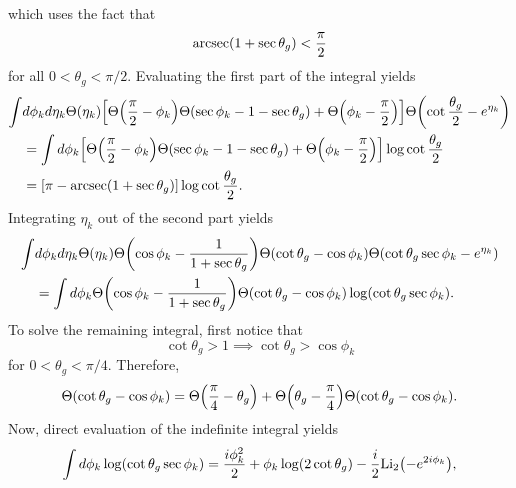 \documentclass[11pt,twoside,reqno]{amsart}
\theoremstyle{plain}
\theoremstyle{remark}
\theoremstyle{definition}
\theoremstyle{remark}
\theoremstyle{definition}
\theoremstyle{definition}
\newcommand{\Li}{\mathrm{Li}}
\begin{document}
	which uses the fact that
	\begin{equation}
		\arcsec(1 + \sec\theta_g) < \frac{\pi}{2}
	\end{equation}
	for all $0 < \theta_g < \pi/2$. Evaluating the first part of the integral yields
	\begin{equation}
	\begin{aligned}
		\int &d\phi_k d\eta_k \Theta(\eta_k) \qty[\Theta\qty(\frac{\pi}{2} - \phi_k)\Theta\qty(\sec\phi_k - 1 - \sec\theta_g) + \Theta\qty(\phi_k - \frac{\pi}{2})] \Theta\qty(\cot\frac{\theta_g}{2} - e^{\eta_k}) \\
		&= \int d\phi_k \qty[\Theta\qty(\frac{\pi}{2} - \phi_k)\Theta\qty(\sec\phi_k - 1 - \sec\theta_g) + \Theta\qty(\phi_k - \frac{\pi}{2})] \log\cot\frac{\theta_g}{2} \\
		&= \qty[\pi - \arcsec(1 + \sec\theta_g)]\log\cot\frac{\theta_g}{2} .
	\end{aligned}
	\end{equation}
	Integrating $\eta_k$ out of the second part yields
	\begin{equation}\label{eq:second part integral}
	\begin{aligned}
		\int &d\phi_k d\eta_k \Theta(\eta_k)\Theta\qty(\cos\phi_k - \frac{1}{1+\sec\theta_g})\Theta(\cot\theta_g - \cos\phi_k) \Theta\qty(\cot\theta_g\sec\phi_k - e^{\eta_k}) \\
		&= \int d\phi_k \Theta\qty(\cos\phi_k - \frac{1}{1+\sec\theta_g})\Theta(\cot\theta_g - \cos\phi_k) \log(\cot\theta_g \sec\phi_k ).
	\end{aligned}
	\end{equation}
	To solve the remaining integral, first notice that
	\begin{equation}
		\cot\theta_g > 1 \implies \cot\theta_g > \cos\phi_k
	\end{equation}
	for $0 < \theta_g < \pi/4$. Therefore,
	\begin{equation}\label{eq:second part integral bounds}
		\Theta(\cot\theta_g - \cos\phi_k) = \Theta\qty(\frac{\pi}{4} - \theta_g) + \Theta\qty(\theta_g - \frac{\pi}{4})\Theta(\cot\theta_g - \cos\phi_k).
	\end{equation}
	Now, direct evaluation of the indefinite integral yields
	\begin{equation}
		\int d\phi_k \log(\cot\theta_g \sec\phi_k ) = \frac{i \phi_k^2}{2} + \phi_k \log(2\cot\theta_g) - \frac{i}{2}\Li_2\qty(-e^{2i\phi_k}),
	\end{equation}
\end{document}
